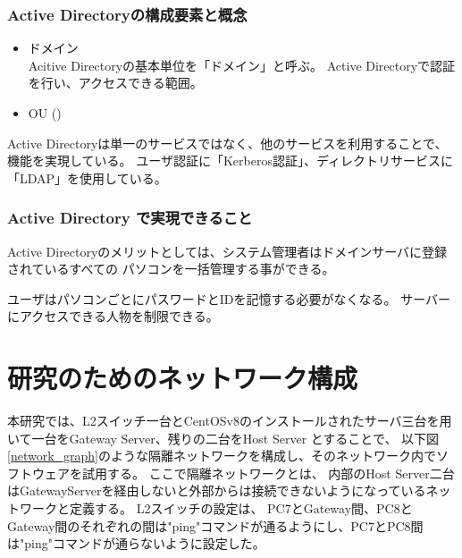 \documentclass[12pt,a4paper,titlepage]{jsarticle}
\begin{document}

\subsubsection*{Active Directoryの構成要素と概念}

\begin{itemize}
    \item ドメイン\mbox{}\\
    Acitive Directoryの基本単位を「ドメイン」と呼ぶ。
    Active Directoryで認証を行い、アクセスできる範囲。
    
    \item OU ()




\end{itemize}


Active Directoryは単一のサービスではなく、他のサービスを利用することで、機能を実現している。
ユーザ認証に「Kerberos認証」、ディレクトリサービスに「LDAP」を使用している。


\subsubsection*{Active Directory で実現できること}
Active Directoryのメリットとしては、システム管理者はドメインサーバに登録されているすべての
パソコンを一括管理する事ができる。

ユーザはパソコンごとにパスワードとIDを記憶する必要がなくなる。
サーバーにアクセスできる人物を制限できる。


\fi


\section{研究のためのネットワーク構成}
本研究では、L2スイッチ一台とCentOSv8のインストールされたサーバ三台を用いて一台をGateway Server、残りの二台をHost Server
とすることで、
以下図\ref{network_graph}のような隔離ネットワークを構成し、そのネットワーク内でソフトウェアを試用する。
ここで隔離ネットワークとは、
内部のHost Server二台はGatewayServerを経由しないと外部からは接続できないようになっているネットワークと定義する。
L2スイッチの設定は、
PC7とGateway間、PC8とGateway間のそれぞれの間は"ping"コマンドが通るようにし、PC7とPC8間は"ping"コマンドが通らないように設定した。
\end{document}
